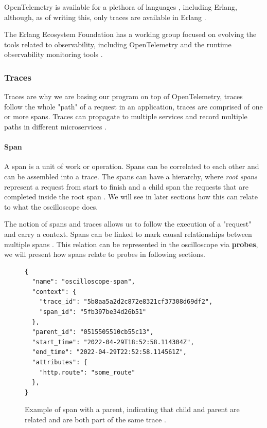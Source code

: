    OpenTelemetry is available for a plethora of languages \cite{otel-l}, including Erlang, although, as of writing this, only traces are available in Erlang \cite{otel-in}.
     
    The Erlang Ecosystem Foundation has a working group focused on evolving the tools related to observability, including OpenTelemetry and the runtime observability monitoring tools \cite{obs-group}. 
    
    \subsubsection{Traces}
        Traces are why we are basing our program on top of OpenTelemetry, traces follow the whole "path" of a request in an application, traces are comprised of one or more spans. Traces can propagate to multiple services and record multiple paths in different microservices \cite{otel-dt}. 
        
        \paragraph{Span} A span is a unit of work or operation. Spans can be correlated to each other and can be assembled into a trace. The spans can have a hierarchy, where \textit{root spans} represent a request from start to finish and a child span the requests that are completed inside the root span \cite{otel-dt}. We will see in later sections how this can relate to what the oscilloscope does.

    The notion of spans and traces allows us to follow the execution of a "request" and carry a context. Spans can be linked to mark causal relationships between multiple spans \cite{otel-t}. This relation can be represented in the oscilloscope via \textbf{probes}, we will present how spans relate to probes in following sections.
    \begin{figure}[H]
    \begin{verbatim} 
{
  "name": "oscilloscope-span",
  "context": {
    "trace_id": "5b8aa5a2d2c872e8321cf37308d69df2",
    "span_id": "5fb397be34d26b51"
  },
  "parent_id": "0515505510cb55c13",
  "start_time": "2022-04-29T18:52:58.114304Z",
  "end_time": "2022-04-29T22:52:58.114561Z",
  "attributes": {
    "http.route": "some_route"
  },
}
    \end{verbatim}

    \caption{Example of span with a parent, indicating that child and parent are related and are both part of the same trace \cite{otel-t}.}

    \end{figure}


